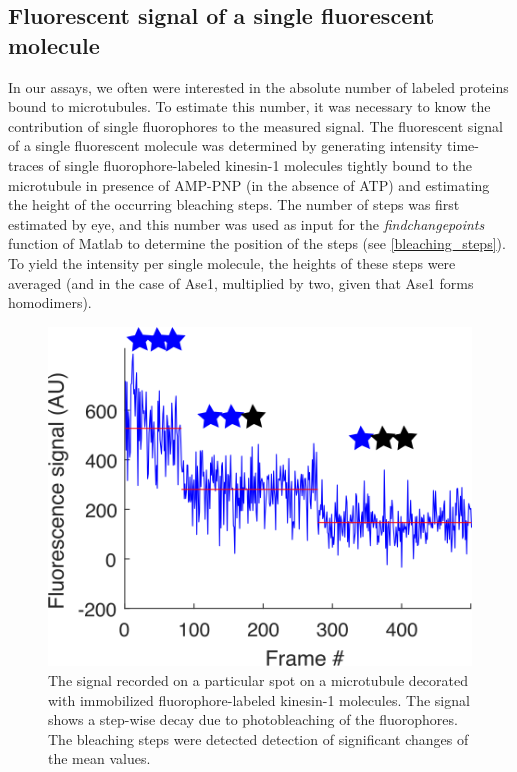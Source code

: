 \subsection{Fluorescent signal of a single fluorescent molecule} 
In our assays, we often were interested in the absolute number of labeled proteins bound to microtubules. To estimate this number, it was necessary to know the contribution of single fluorophores to the measured signal. The fluorescent signal of a single fluorescent molecule was determined by generating intensity time-traces of single fluorophore-labeled kinesin-1 molecules tightly bound to the microtubule in presence of AMP-PNP (in the absence of ATP) and estimating the height of the occurring bleaching steps. The number of steps was first estimated by eye, and this number was used as input for the \textit{findchangepoints} function of Matlab to determine the position of the steps (see \autoref{bleaching_steps}). To yield the intensity per single molecule, the heights of these steps were averaged (and in the case of Ase1, multiplied by two, given that Ase1 forms homodimers).
\begin{figure}[htb]
\centering
\includegraphics[scale=1.1]{Figures/bleaching_steps.png}
\caption[An illustration explaining our estimation of the fluorescent signal of a single fluorophore.]{
		The signal recorded on a particular spot on a microtubule decorated with immobilized fluorophore-labeled kinesin-1 molecules. The signal shows a step-wise decay due to photobleaching of the fluorophores. The bleaching steps were detected detection of significant changes of the mean values.
	}\label{bleaching_steps}
\end{figure}


